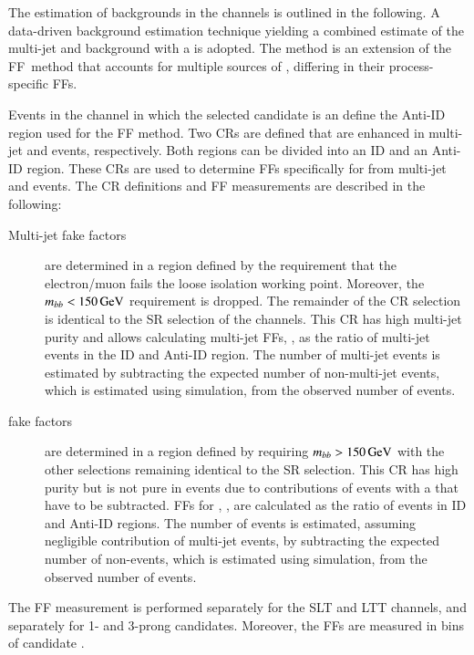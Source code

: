 The estimation of \jettotauhadvis backgrounds in the \lephad channels is
outlined in the following. A data-driven background estimation technique
yielding a combined estimate of the multi-jet and \ttbar background with a
\faketauhadvis is adopted. The method is an extension of the FF~method
that accounts for multiple sources of \faketauhadvis, differing in their
process-specific FFs.

Events in the \lephad channel in which the selected \tauhadvis candidate is an
\antitau define the Anti-ID region used for the FF method. Two CRs are defined
that are enhanced in multi-jet and \ttbar events, respectively. Both regions can
be divided into an ID and an Anti-ID region. These CRs are used to determine FFs
specifically for \faketauhadvis from multi-jet and \ttbar events. The CR
definitions and FF measurements are described in the following:
\begin{description}

\item[Multi-jet fake factors] are determined in a region defined by the
  requirement that the electron/muon fails the loose isolation working
  point. Moreover, the $m_{bb} < \SI{150}{\ensuremath{\text{GeV}}}$ requirement is dropped. The
  remainder of the CR selection is identical to the SR selection of the \lephad
  channels. This CR has high multi-jet purity and allows calculating multi-jet
  FFs, \FFqcd, as the ratio of multi-jet events in the ID and Anti-ID
  region. The number of multi-jet events is estimated by subtracting the
  expected number of non-multi-jet events, which is estimated using simulation,
  from the observed number of events.

\item[\ttbar fake factors] are determined in a region defined by requiring
  $m_{bb} > \SI{150}{\ensuremath{\text{GeV}}}$ with the other selections remaining identical to the
  SR selection. This CR has high \ttbar purity but is not pure in \ttbarFakes
  events due to contributions of \ttbar events with a \truetauhadvis that have
  to be subtracted. FFs for \ttbar, \FFttbar, are calculated as the ratio of
  \ttbarFakes events in ID and Anti-ID regions. The number of \ttbarFakes events
  is estimated, assuming negligible contribution of multi-jet events, by
  subtracting the expected number of non-\ttbarFakes events, which is estimated
  using simulation, from the observed number of events.

\end{description}
The FF measurement is performed separately for the \lephad SLT and LTT channels,
and separately for 1- and 3-prong \tauhadvis candidates. Moreover, the FFs are
measured in bins of \tauhadvis candidate \pT.

